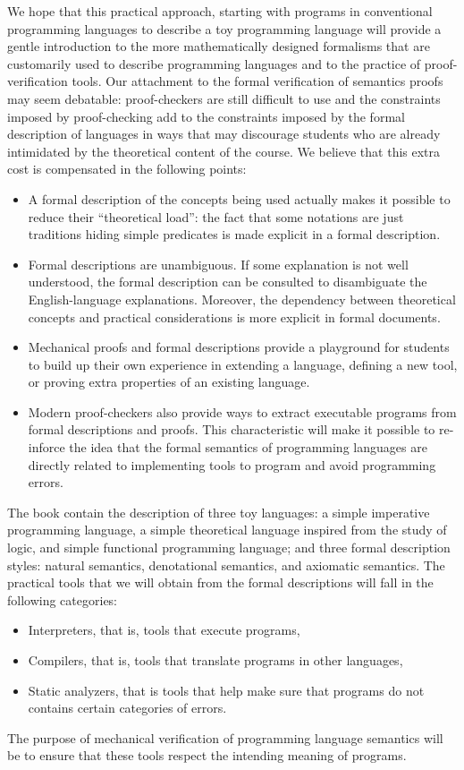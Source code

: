 \documentclass{book}
\begin{document}
We hope that this practical approach, starting with programs in
conventional programming languages to describe a toy programming
language will provide a gentle introduction to the more mathematically
designed formalisms that are customarily used to describe programming
languages and to the practice of proof-verification tools.
Our attachment to the formal verification of semantics
proofs may seem debatable: proof-checkers are still difficult to
use and the constraints imposed by proof-checking add to the
constraints imposed by the formal description of languages in ways
that may discourage students who are already intimidated by the
theoretical content of the course.  We believe that this extra cost is
compensated in the following points:
\begin{itemize}
  \item A formal description of the concepts being used actually makes it
    possible to reduce their ``theoretical load'': the fact that some
    notations are just traditions hiding simple predicates is made explicit
    in a formal description.
  \item Formal descriptions are unambiguous.  If some explanation is not
    well understood, the formal description can be consulted to disambiguate
    the English-language explanations.  Moreover, the dependency between
    theoretical concepts and practical considerations is more explicit
    in formal documents.
  \item Mechanical proofs and formal descriptions provide a playground for
    students to build up their own experience in extending a language,
    defining a new tool, or     proving extra properties of an existing
    language.
  \item Modern proof-checkers also provide ways to extract executable programs
    from formal descriptions and proofs.  This characteristic will make it
    possible to re-inforce the idea that the formal semantics of programming
    languages are directly related to implementing tools to
    program and avoid programming errors.
\end{itemize}

The book contain the description of three toy languages: a simple
imperative programming language, a simple theoretical language inspired
from the study of logic, and simple functional programming language; and three
formal description styles: natural semantics, denotational semantics, and
axiomatic semantics.  The practical tools that we will obtain
from the formal descriptions will fall in the following categories:
\begin{itemize}
  \item Interpreters, that is, tools that execute programs,
  \item Compilers, that is, tools that translate programs in other
    languages,
  \item Static analyzers, that is tools that help make sure that programs
    do not contains certain categories of errors.
\end{itemize}
The purpose of mechanical verification of programming language semantics
will be to ensure that these tools respect the intending meaning of programs.
\end{document}
